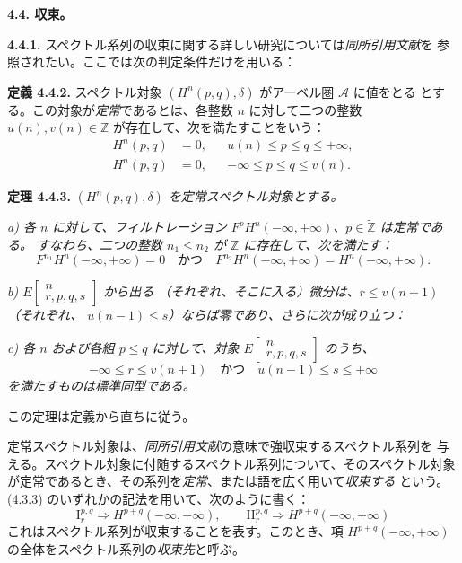 \clearpage
{}%
\begingroup\small\setlength{\parskip}{0pt}\setlength{\emergencystretch}{1.5em}
\medskip\noindent\textbf{4.4. 収束。}

\medskip\noindent\textbf{4.4.1.}\quad
スペクトル系列の収束に関する詳しい研究については\emph{同所引用文献}を
参照されたい。ここでは次の判定条件だけを用いる：

\medskip\noindent\textbf{定義 4.4.2.}\quad
スペクトル対象 $(H^n(p,q),\delta)$ がアーベル圏 $\mathcal A$ に値をとる
とする。この対象が\emph{定常}であるとは、各整数 $n$ に対して二つの整数
$u(n),v(n)\in\mathbb Z$ が存在して、次を満たすことをいう：
\[
\begin{aligned}
H^n(p,q)&=0,&&u(n)\leq p\leq q\leq+\infty,\\
H^n(p,q)&=0,&&-\infty\leq p\leq q\leq v(n).
\end{aligned}
\]

\medskip\noindent\textbf{定理 4.4.3.}\quad
\textit{$(H^n(p,q),\delta)$ を定常スペクトル対象とする。}

\textit{a) 各 $n$ に対して、フィルトレーション
$F^pH^n(-\infty,+\infty)$、$p\in\widetilde{\mathbb Z}$ は定常である。
すなわち、二つの整数 $n_1\leq n_2$ が $\mathbb Z$ に存在して、次を満たす：}
\[
F^{n_1}H^n(-\infty,+\infty)=0
\quad\text{かつ}\quad
F^{n_2}H^n(-\infty,+\infty)=H^n(-\infty,+\infty).
\]

\textit{b)
$E\!\left[\begin{smallmatrix}n\\r,p,q,s\end{smallmatrix}\right]$ から出る
（それぞれ、そこに入る）微分は、$r\leq v(n+1)$（それぞれ、
$u(n-1)\leq s$）ならば零であり、さらに次が成り立つ：}

\textit{c) 各 $n$ および各組 $p\leq q$ に対して、対象
$E\!\left[\begin{smallmatrix}n\\r,p,q,s\end{smallmatrix}\right]$ のうち、}
\[
-\infty\leq r\leq v(n+1)
\quad\text{かつ}\quad
u(n-1)\leq s\leq+\infty
\]
\textit{を満たすものは標準同型である。}

この定理は定義から直ちに従う。

定常スペクトル対象は、\emph{同所引用文献}の意味で強収束するスペクトル系列を
与える。スペクトル対象に付随するスペクトル系列について、そのスペクトル対象
が定常であるとき、その系列を\emph{定常}、または語を広く用いて\emph{収束する}
という。(4.3.3) のいずれかの記法を用いて、次のように書く：
\[
\mathrm I_r^{p,q}\Longrightarrow H^{p+q}(-\infty,+\infty),
\qquad
\mathrm{II}_r^{p,q}\Longrightarrow H^{p+q}(-\infty,+\infty)
\]
これはスペクトル系列が収束することを表す。このとき、項
$H^{p+q}(-\infty,+\infty)$ の全体をスペクトル系列の\emph{収束先}と呼ぶ。
\endgroup
